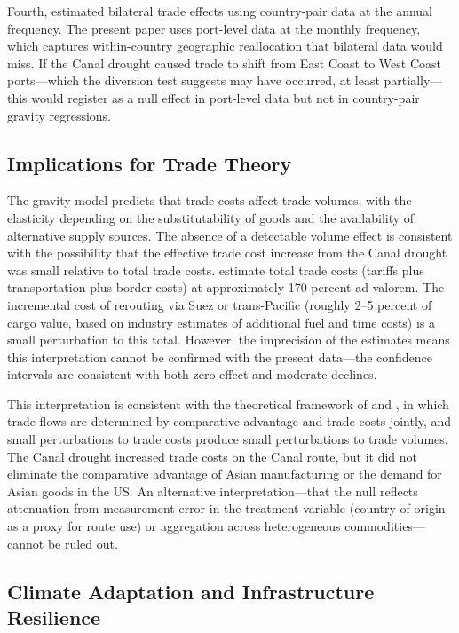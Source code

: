 \documentclass[12pt]{article}
\begin{document}
Fourth, \citet{feyrer2021distance} estimated bilateral trade effects using country-pair data at the annual frequency. The present paper uses port-level data at the monthly frequency, which captures within-country geographic reallocation that bilateral data would miss. If the Canal drought caused trade to shift from East Coast to West Coast ports---which the diversion test suggests may have occurred, at least partially---this would register as a null effect in port-level data but not in country-pair gravity regressions.

\subsection{Implications for Trade Theory}

The gravity model predicts that trade costs affect trade volumes, with the elasticity depending on the substitutability of goods and the availability of alternative supply sources. The absence of a detectable volume effect is consistent with the possibility that the effective trade cost increase from the Canal drought was small relative to total trade costs. \citet{anderson2004trade} estimate total trade costs (tariffs plus transportation plus border costs) at approximately 170 percent ad valorem. The incremental cost of rerouting via Suez or trans-Pacific (roughly 2--5 percent of cargo value, based on industry estimates of additional fuel and time costs) is a small perturbation to this total. However, the imprecision of the estimates means this interpretation cannot be confirmed with the present data---the confidence intervals are consistent with both zero effect and moderate declines.

This interpretation is consistent with the theoretical framework of \citet{eaton2002technology} and \citet{costinot2012new}, in which trade flows are determined by comparative advantage and trade costs jointly, and small perturbations to trade costs produce small perturbations to trade volumes. The Canal drought increased trade costs on the Canal route, but it did not eliminate the comparative advantage of Asian manufacturing or the demand for Asian goods in the US. An alternative interpretation---that the null reflects attenuation from measurement error in the treatment variable (country of origin as a proxy for route use) or aggregation across heterogeneous commodities---cannot be ruled out.

\subsection{Climate Adaptation and Infrastructure Resilience}
\end{document}
